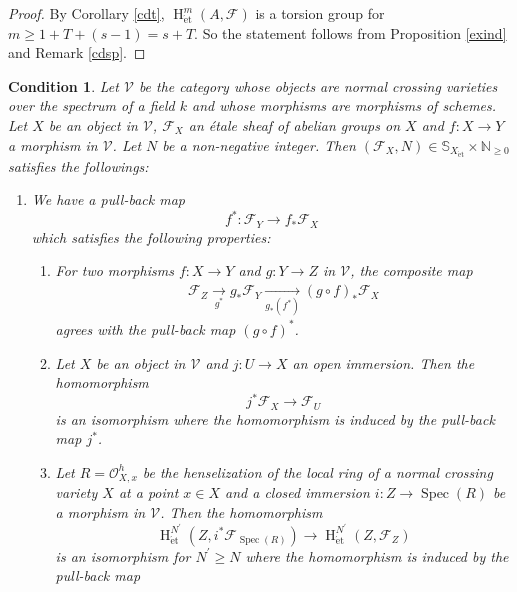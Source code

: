 \documentclass{article}
\newtheorem{cond}[thm]{\indent \sc Condition}
\newcommand{\spec}{\operatorname{Spec}}
\newcommand{\et}{\mathrm{\acute{e}t}}
\newcommand{\HO}{\operatorname{H}}
\begin{document}
%
\begin{proof}\upshape
By Corollary \ref{cdt}, 
$\HO_{\et}^{m}(A, \mathcal{F})$ is a torsion group for
$m\geq 1+T+(s-1)=s+T$.
So the statement follows from Proposition \ref{exind}
and Remark \ref{cdsp}.
\end{proof}
%


\begin{cond}\upshape\label{cdpb}
Let $\mathcal{V}$ be the category whose
objects are normal crossing varieties over the spectrum of
a field $k$
and
whose morphisms are morphisms of schemes.
Let $X$ be an object in $\mathcal{V}$, 
$\mathcal{F}_{X}$ an \'{e}tale sheaf 
of abelian groups
on $X$
and
$f: X\to Y$
a morphism in $\mathcal{V}$. Let $N$ be a non-negative integer.
Then $(\mathcal{F}_{X}, N)\in \mathbb{S}_{X_{\et}}\times \mathbb{N}_{\geq 0}$
satisfies the followings:
%
\begin{enumerate}
\item We have a pull-back map
%
\begin{equation*}
f^{*}: \mathcal{F}_{Y}
\to
f_{*}\mathcal{F}_{X}
\end{equation*}
%
which satisfies the following properties:
\begin{enumerate}
%
\item[(i)] For two morphisms $f: X\to Y$
and $g: Y\to Z$ in $\mathcal{V}$,
the composite map
%
\begin{align*}
\mathcal{F}_{Z}
\xrightarrow[g^{*}]{}
g_{*}\mathcal{F}_{Y}
\xrightarrow[g_{*}(f^{*})]{}
(g\circ f)_{*}\mathcal{F}_{X}
\end{align*}
%
agrees with the pull-back map
$(g\circ f)^{*}$.
%
\item[(ii)] Let $X$ be an object in $\mathcal{V}$
and $j: U\to X$ an open immersion. Then the homomorphism
%
\begin{equation*}
j^{*}\mathcal{F}_{X}
\to 
\mathcal{F}_{U}
\end{equation*}
%
is an isomorphism where the homomorphism is induced by the pull-back map $j^{*}$.
%
\item[(iii)] Let 
$R=\mathcal{O}_{X, x}^{h}$
be the henselization of the local ring of a normal crossing variety $X$
at a point $x\in X$ and a closed immersion
$i: Z\to\spec(R)$ be a morphism in $\mathcal{V}$.
Then the homomorphism
%
\begin{equation*}
\HO^{N^{\prime}}_{\et}(Z,
i^{*}\mathcal{F}_{\spec(R)})
\to
\HO^{N^{\prime}}_{\et}(Z,
\mathcal{F}_{Z})
\end{equation*}
%
is an isomorphism for $N^{\prime}\geq N$ where
the homomorphism is induced by the pull-back map

\end{enumerate}
\end{enumerate}
\end{cond}
\end{document}
